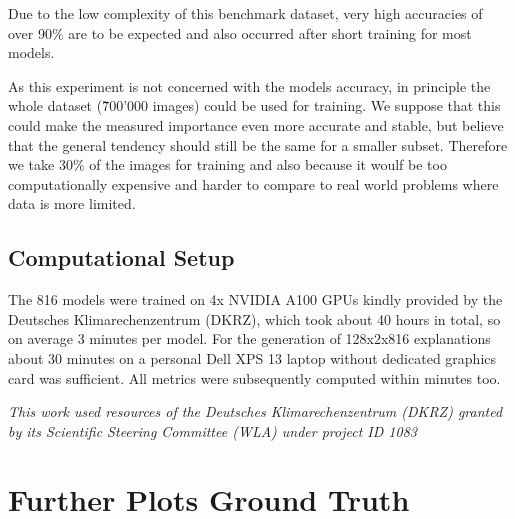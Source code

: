 Due to the low complexity of this benchmark dataset, very high accuracies of over 90\% are to be expected and also occurred after short training for most models.

As this experiment is not concerned with the models accuracy, in principle the whole dataset (\~ 700'000 images) could be used for training. We suppose that this could make the measured importance even more accurate and stable, but believe that the general tendency should still be the same for a smaller subset. Therefore we take $30\%$ of the images for training and also because it woulf be too computationally expensive and harder to compare to real world problems where data is more limited. 

\subsection{Computational Setup}\label{section:setup}
The 816 models were trained on 4x NVIDIA A100 GPUs kindly provided by the Deutsches Klimarechenzentrum (DKRZ), which took about 40 hours in total, so on average 3 minutes per model. 
For the generation of 128x2x816 explanations about 30 minutes on a personal Dell XPS 13 laptop without dedicated graphics card was sufficient. All metrics were subsequently computed within minutes too. 

\textit{This work used resources of the Deutsches Klimarechenzentrum (DKRZ) granted by its Scientific Steering Committee (WLA) under project ID 1083}


\section{Further Plots Ground Truth}

